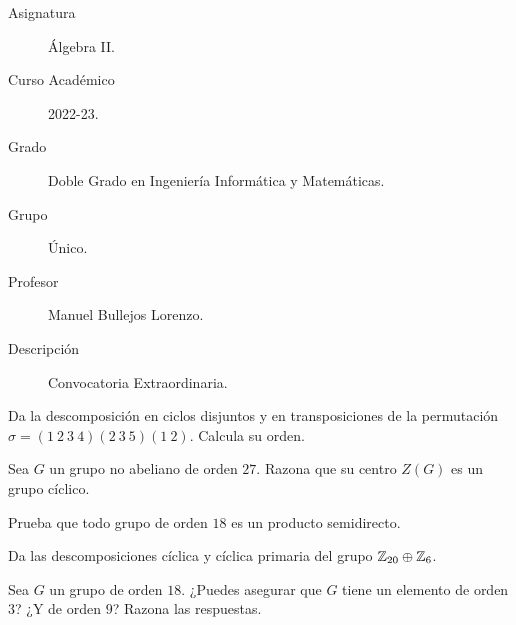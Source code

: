 \documentclass[12pt]{article}
\begin{document}

    
    

    \begin{description}
        \item[Asignatura] Álgebra II.
        \item[Curso Académico] 2022-23.
        \item[Grado] Doble Grado en Ingeniería Informática y Matemáticas.
        \item[Grupo] Único.
        \item[Profesor] Manuel Bullejos Lorenzo.
        \item[Descripción] Convocatoria Extraordinaria.
    
    \end{description}
    \newpage

    \begin{ejercicio}
        Da la descomposición en ciclos disjuntos y en transposiciones de la permutación $\sigma = (1\ 2\ 3\ 4)(2\ 3\ 5)(1\ 2)$. Calcula su orden.
    \end{ejercicio}

    \begin{ejercicio}
        Sea $G$ un grupo no abeliano de orden $27$. Razona que su centro $Z(G)$ es un grupo cíclico.
    \end{ejercicio}

    \begin{ejercicio}
        Prueba que todo grupo de orden $18$ es un producto semidirecto.
    \end{ejercicio}

    \begin{ejercicio}
        Da las descomposiciones cíclica y cíclica primaria del grupo $\mathbb{Z}_{20} \oplus \mathbb{Z}_6$.
    \end{ejercicio}

    \begin{ejercicio}
        Sea $G$ un grupo de orden $18$. ¿Puedes asegurar que $G$ tiene un elemento de orden $3$? ¿Y de orden $9$? Razona las respuestas.
    \end{ejercicio}
\end{document}
